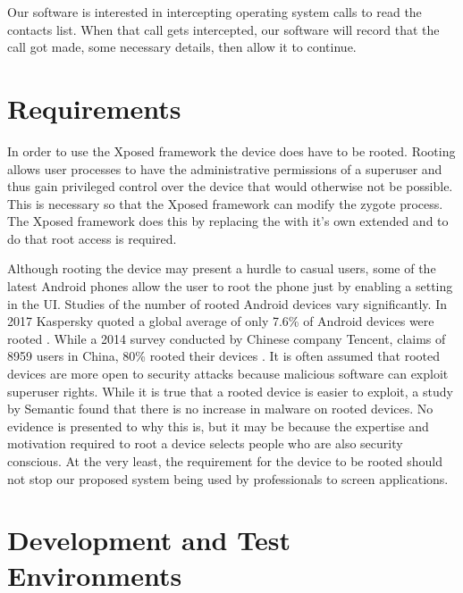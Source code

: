 Our software is interested in intercepting operating system calls to read the contacts list.  When that call gets intercepted, our software will record that the call got made, some necessary details, then allow it to continue.

\section{Requirements}
\label{sec:Requirements}

In order to use the Xposed framework the device does have to be rooted.  Rooting allows user processes to have the administrative permissions of a superuser and thus gain privileged control over the device that would otherwise not be possible.  This is necessary so that the Xposed framework can modify the zygote process.  The Xposed framework does this by replacing the  with it's own extended  and to do that root access is required.

Although rooting the device may present a hurdle to casual users, some of the latest Android phones allow the user to root the phone just by enabling a setting in the UI.  Studies of the number of rooted Android devices vary significantly.  In 2017 Kaspersky quoted a global average of only 7.6\% of Android devices were rooted \cite{KaperskyRootedDevices}.  While a 2014 survey conducted by Chinese company Tencent, claims of 8959 users in China, 80\% rooted their devices \cite{CIWRootedDevices}.  It is often assumed that rooted devices are more open to security attacks because malicious software can exploit superuser rights.  While it is true that a rooted device is easier to exploit, a study by Semantic \cite{InsightsIntoRooted} found that there is no increase in malware on rooted devices.  No evidence is presented to why this is, but it may be because the expertise and motivation required to root a device selects people who are also security conscious.  At the very least, the requirement for the device to be rooted should not stop our proposed system being used by professionals to screen applications.

\section{Development and Test Environments}
\label{sec:Development and Test Environments}

